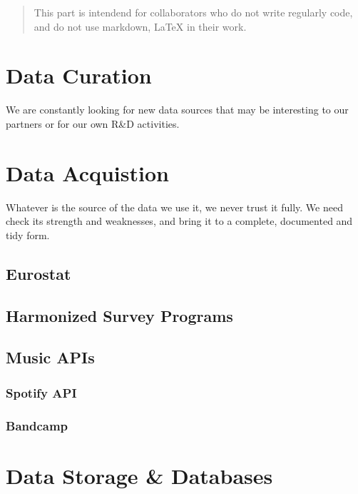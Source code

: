 \documentclass[
  fontsize=13pt,
  english,
  a4paper,
  openany, a4paper, oneside]{article}
\begin{document}
\begin{quote}
This part is intendend for collaborators who do not write regularly code, and do not use markdown, LaTeX in their work.
\end{quote}

\hypertarget{data-curation}{%
\section{Data Curation}\label{data-curation}}

We are constantly looking for new data sources that may be interesting to our partners or for our own R\&D activities.

\hypertarget{acquisition}{%
\section{Data Acquistion}\label{acquisition}}

Whatever is the source of the data we use it, we never trust it fully. We need check its strength and weaknesses, and bring it to a complete, documented and tidy form.

\hypertarget{eurostat}{%
\subsection{Eurostat}\label{eurostat}}

\hypertarget{harmonized-survey-programs}{%
\subsection{Harmonized Survey Programs}\label{harmonized-survey-programs}}

\hypertarget{music-apis}{%
\subsection{Music APIs}\label{music-apis}}

\hypertarget{spotify-api}{%
\subsubsection{Spotify API}\label{spotify-api}}

\hypertarget{bandcamp}{%
\subsubsection{Bandcamp}\label{bandcamp}}

\hypertarget{data-storage-databases}{%
\section{Data Storage \& Databases}\label{data-storage-databases}}
\end{document}
